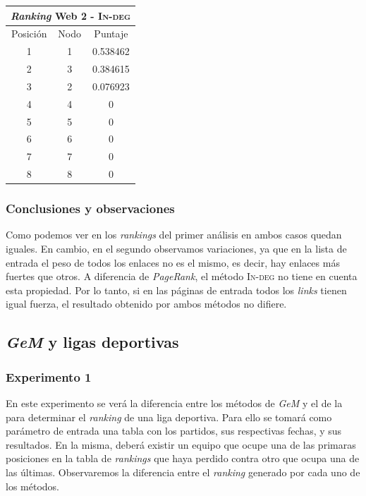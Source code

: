 \begin{center}
	      			\begin{tabular}{c|c|c}
			      		\hline
			  				\multicolumn{3}{c}{\emph{Ranking} Web 2 - \textsc{In-deg}} \\
			 			\hline
	        			Posición & Nodo & Puntaje \\ \hline
	         			1 & 1 & 0.538462 \\
	        			2 & 3 & 0.384615 \\
	        			3 & 2 & 0.076923 \\
	        			4 & 4 & 0 \\
	        			5 & 5 & 0 \\
	        			6 & 6 & 0 \\
	        			7 & 7 & 0 \\
	        			8 & 8 & 0 \\
	      			\end{tabular}
	    	\end{center}

			\subsubsection*{Conclusiones y observaciones} 
			Como podemos ver en los \emph{rankings} del primer análisis en ambos casos quedan iguales. En cambio, en el segundo observamos variaciones, ya que en la lista de entrada el peso de todos los enlaces no es el mismo, es decir, hay enlaces más fuertes que otros. A diferencia de \emph{PageRank}, el método \textsc{In-deg} no tiene en cuenta esta propiedad. Por lo tanto, si en las páginas de entrada todos los \emph{links} tienen igual fuerza, el resultado obtenido por ambos métodos no difiere. 


	\subsection{\emph{GeM} y ligas deportivas}
		
		\subsubsection{Experimento 1}
		En este experimento se verá la diferencia entre los métodos de \emph{GeM} y el de la  para determinar el \emph{ranking} de una liga deportiva. Para ello se tomará como parámetro de entrada una tabla con los partidos, sus respectivas fechas, y sus resultados. En la misma, deberá existir un equipo que ocupe una de las primaras posiciones en la tabla de \emph{rankings} que haya perdido contra otro que ocupa una de las últimas. Observaremos la diferencia entre el \emph{ranking} generado por cada uno de los métodos.

